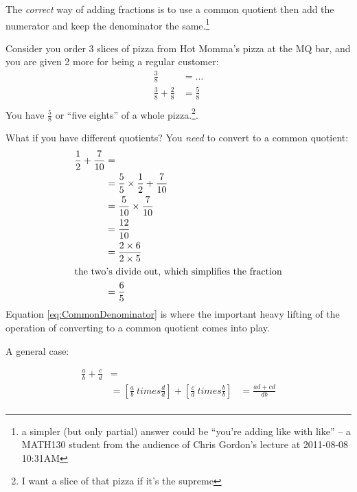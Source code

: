 The \emph{correct} way of adding fractions is to use a common quotient then add
the numerator and keep the denominator the same.\footnote{a simpler (but only
partial) answer could be ``you're adding like with like'' -- a MATH130 student
from the audience of Chris Gordon's lecture at 2011-08-08 10:31AM}

Consider you order 3 slices of pizza from Hot Momma's pizza at the MQ bar, and
you are given 2 more for being a regular customer:
\begin{align}
  \frac{3}{8} & = \ldots \\
  \frac{3}{8} + \frac{2}{8} & = \frac{5}{8} \\
\end{align}
You have $\frac{5}{8}$ or ``five eights'' of a whole pizza.\footnote{I want a
slice of that pizza if it's the supreme}.

What if you have different quotients? You \emph{need} to convert to a common
quotient:
\begin{align}
 \frac{1}{2} + \frac{7}{10} & = \\
    & = \frac{5}{5} \times \frac{1}{2} + \frac{7}{10} \\
    & = \frac{5}{10} \times \frac{7}{10} \label{eq:CommonDenominator}\\
    & = \frac{12}{10} \\
    & = \frac{2 \times 6}{2 \times 5} \\
  \intertext{the two's divide out, which simplifies the fraction}  
    & = \frac{6}{5} \\
\end{align}
Equation \ref{eq:CommonDenominator} is where the important heavy lifting of the
operation of converting to a common quotient comes into play.

A general case:

\begin{align}
  \frac{a}{b} + \frac{c}{d} & = \\
    & = [\frac{a}{b} \ times \frac{d}{d}] + [\frac{c}{d} \ times \frac{b}{b} ]
    & = \frac{ad + cd}{db} \\
\end{align}

\newpage
